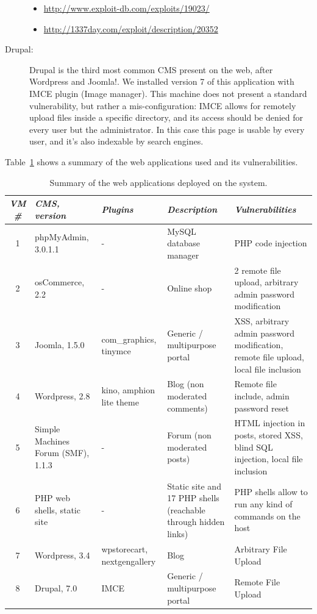 \begin{description}
\begin{itemize}
\item
\url{http://www.exploit-db.com/exploits/19023/}
\item
\url{http://1337day.com/exploit/description/20352}
\end{itemize}

\item[Drupal: ] Drupal \cite{drupal} is the third most common CMS present on the web, after Wordpress and Joomla!. We installed version 7 of this application with IMCE plugin (Image manager). This machine does not present a standard vulnerability, but rather a mis-configuration: IMCE allows for remotely upload files inside a specific directory, and its access should be denied for every user but the administrator. In this case this page is usable by every user, and it's also indexable by search engines.
\end{description}

Table~\ref{tab:webapps} shows a summary of the web applications used and its vulnerabilities.

\begin{table}[tbh] %
\begin{center}
\begin{tabularx}{\textwidth}{|c|X|X|X|X|}
\hline
\textit{VM \#} & \textit{CMS, version} & \textit{Plugins} & \textit{Description} & \textit{Vulnerabilities} \\
\hline
1 & phpMyAdmin, 3.0.1.1 & - & MySQL database manager & PHP code injection \\
2 & osCommerce, 2.2 & - & Online shop & 2 remote file upload, arbitrary admin password modification \\
3 & Joomla, 1.5.0 & com\_graphics, tinymce & Generic / multipurpose portal & XSS, arbitrary admin password modification, remote file upload, local file inclusion \\
4 & Wordpress, 2.8 & kino, amphion lite theme & Blog (non moderated comments) & Remote file include, admin password reset \\
5 & Simple Machines Forum (SMF), 1.1.3 & - & Forum (non moderated posts) & HTML injection in posts, stored XSS, blind SQL injection, local file inclusion \\
6 & PHP web shells, static site & - & Static site and 17 PHP shells (reachable through hidden links) & PHP shells allow to run any kind of commands on the host \\
7 & Wordpress, 3.4 & wpstorecart, nextgengallery & Blog & Arbitrary File Upload \\
8 & Drupal, 7.0 & IMCE & Generic / multipurpose portal & Remote File Upload \\
\hline
\end{tabularx}
\caption{Summary of the web applications deployed on the system.\label{tab:webapps}}
\end{center}
\end{table}

